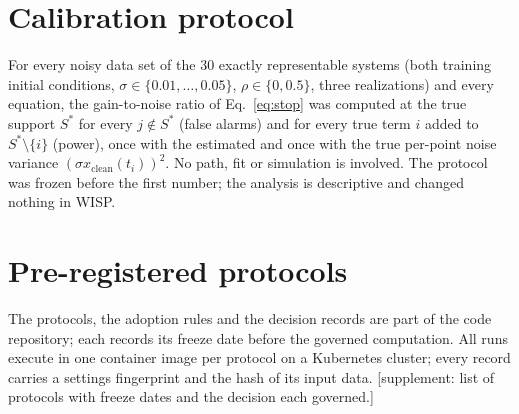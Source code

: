 \documentclass[10pt]{article}
\newcommand{\todo}[1]{\textcolor{prelim}{\sffamily\footnotesize[#1]}}
\begin{document}
\begin{appendices}
\section{Calibration protocol}\label{app:calibration}
For every noisy data set of the 30 exactly representable systems (both training initial conditions,
$\sigma\in\{0.01,\dots,0.05\}$, $\rho\in\{0,0.5\}$, three realizations) and every equation, the gain-to-noise ratio of
Eq.~\eqref{eq:stop} was computed at the true support $S^*$ for every $j\notin S^*$ (false alarms) and for every true
term $i$ added to $S^*\setminus\{i\}$ (power), once with the estimated and once with the true per-point noise variance
$(\sigma x_{\mathrm{clean}}(t_i))^2$. No path, fit or simulation is involved. The protocol was frozen before the first
number; the analysis is descriptive and changed nothing in WISP.

\section{Pre-registered protocols}\label{app:protocols}
The protocols, the adoption rules and the decision records are part of the code repository; each records its freeze
date before the governed computation. All runs execute in one container image per protocol on a Kubernetes cluster;
every record carries a settings fingerprint and the hash of its input data. \todo{supplement: list of protocols with
freeze dates and the decision each governed.}

\end{appendices}
\end{document}
